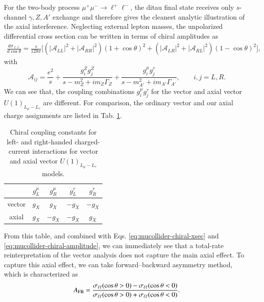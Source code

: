 \documentclass[onecolumn, aps, nofootinbib, prd, preprint, floats, floatfix, amsmath, amssymb, superscriptaddress, preprintnumbers]{revtex4-2}
\begin{document}
For the two-body process $\mu^+\mu^-\to\ell^+\ell^-$, the ditau final state receives only $s$-channel $\gamma,Z,A'$ exchange and therefore gives the cleanest analytic illustration of the axial interference. 
Neglecting external lepton masses, the unpolarized differential cross section can be written in terms of chiral amplitudes as
\begin{align}
\frac{d\sigma_{\ell\ell}}{d\cos\theta}=
\frac{s}{128\pi}
\bigg[ \left(|\mathcal A_{LL}|^2+|\mathcal A_{RR}|^2\right)(1+\cos\theta)^2 + \left(|\mathcal A_{LR}|^2+|\mathcal A_{RL}|^2\right)(1-\cos\theta)^2 \bigg],
\label{eq:mucollider-chiral-xsec}
\end{align}
with
\begin{equation}
\mathcal A_{ij}
=\frac{e^2}{s}+\frac{g_i^Z g_j^Z}{s-m_Z^2+i m_Z\Gamma_Z}+\frac{g_i^\mu g_j^\tau}{s-m_{A'}^2+i m_{A'}\Gamma_{A'}},
\qquad i,j=L,R .
\label{eq:mucollider-chiral-amplitude}
\end{equation}
We can see that, the coupling combinations $g_i^\mu g_j^\tau$ for the vector and axial vector $U(1)_{L_\mu-L_\tau}$ are different. For comparison, the ordinary vector and our axial charge assignments are listed in Tab. \ref{tab:vector-axial-charges}. 
\begin{table}[htbp]
    \centering
    \begin{tabular}{c|cccc}
    \hline
     & $g_L^\mu$ & $g_R^\mu$ & $g_L^\tau$ & $g_R^\tau$ \\
    \hline
    vector & $g_X$ & $g_X$ & $-g_X$ & $-g_X$ \\
    axial & $g_X$ & $-g_X$ & $-g_X$ & $g_X$ \\
    \hline
    \end{tabular}
    \caption{Chiral coupling constants for left- and right-handed charged-current interactions for vector and axial vector $U(1)_{L_\mu-L_\tau}$ models.}
    \label{tab:vector-axial-charges}
\end{table}
From this table, and combined with Eqs. \eqref{eq:mucollider-chiral-xsec} and \eqref{eq:mucollider-chiral-amplitude}, we can immediately see that a total-rate reinterpretation of the vector analysis does not capture the main axial effect. To capture this axial effect, we can take forward–backward asymmetry method, which is characterized as
\begin{equation}
A_{\rm FB}=
\frac{\sigma_{\ell\ell}(\cos\theta>0)-\sigma_{\ell\ell}(\cos\theta<0)}
{\sigma_{\ell\ell}(\cos\theta>0)+\sigma_{\ell\ell}(\cos\theta<0)}.
\label{eq:mucollider-afb}
\end{equation}
\end{document}
